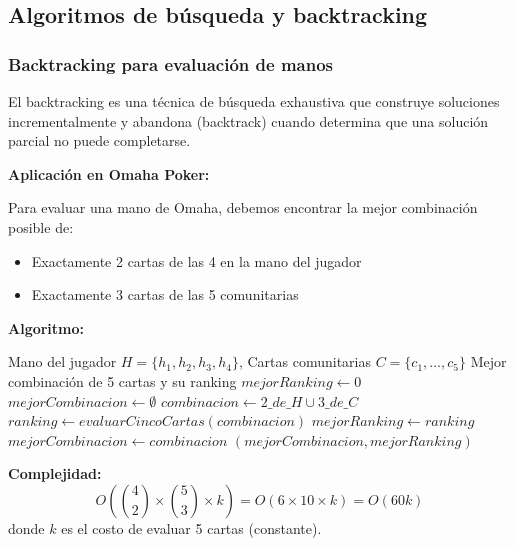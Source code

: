 \documentclass[12pt,a4paper]{article}
\begin{document}
\subsection{Algoritmos de búsqueda y backtracking}

\subsubsection{Backtracking para evaluación de manos}

El backtracking es una técnica de búsqueda exhaustiva que construye soluciones incrementalmente y abandona (backtrack) cuando determina que una solución parcial no puede completarse.

\textbf{Aplicación en Omaha Poker:}

Para evaluar una mano de Omaha, debemos encontrar la mejor combinación posible de:
\begin{itemize}
    \item Exactamente 2 cartas de las 4 en la mano del jugador
    \item Exactamente 3 cartas de las 5 comunitarias
\end{itemize}

\textbf{Algoritmo:}

\begin{algorithm}[H]
\caption{Evaluación de Mano de Omaha}
\begin{algorithmic}[1]
\Require Mano del jugador $H = \{h_1, h_2, h_3, h_4\}$, Cartas comunitarias $C = \{c_1, ..., c_5\}$
\Ensure Mejor combinación de 5 cartas y su ranking
\State $mejorRanking \gets 0$
\State $mejorCombinacion \gets \emptyset$
        \State $combinacion \gets 2\_de\_H \cup 3\_de\_C$
        \State $ranking \gets evaluarCincoCartas(combinacion)$
            \State $mejorRanking \gets ranking$
            \State $mejorCombinacion \gets combinacion$
        \EndIf
    \EndFor
\EndFor
\State \Return $(mejorCombinacion, mejorRanking)$
\end{algorithmic}
\end{algorithm}

\textbf{Complejidad:}
\begin{equation}
    O\left(\binom{4}{2} \times \binom{5}{3} \times k\right) = O(6 \times 10 \times k) = O(60k)
\end{equation}
donde $k$ es el costo de evaluar 5 cartas (constante).
\end{document}
